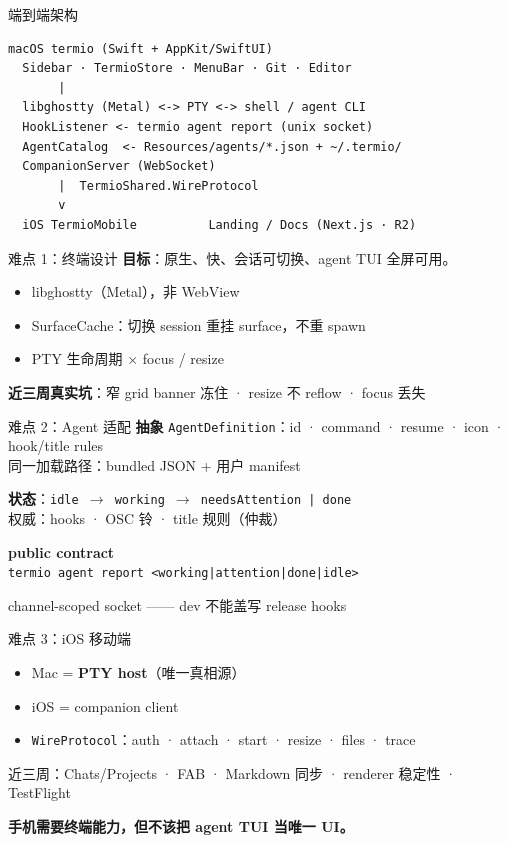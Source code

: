 \documentclass[aspectratio=169,10pt,UTF8]{ctexbeamer}
\begin{document}
\begin{frame}[fragile]{端到端架构}
\begin{lstlisting}[basicstyle=\ttfamily\tiny]
macOS termio (Swift + AppKit/SwiftUI)
  Sidebar · TermioStore · MenuBar · Git · Editor
       |
  libghostty (Metal) <-> PTY <-> shell / agent CLI
  HookListener <- termio agent report (unix socket)
  AgentCatalog  <- Resources/agents/*.json + ~/.termio/
  CompanionServer (WebSocket)
       |  TermioShared.WireProtocol
       v
  iOS TermioMobile          Landing / Docs (Next.js · R2)
\end{lstlisting}
\end{frame}

\begin{frame}{难点 1：终端设计}
  \textbf{目标}：原生、快、会话可切换、agent TUI 全屏可用。
  \begin{itemize}
    \item libghostty（Metal），非 WebView
    \item SurfaceCache：切换 session 重挂 surface，不重 spawn
    \item PTY 生命周期 $\times$ focus / resize
  \end{itemize}
  \vspace{0.4em}
  \textbf{近三周真实坑}：窄 grid banner 冻住 · resize 不 reflow · focus 丢失
\end{frame}

\begin{frame}{难点 2：Agent 适配}
  \textbf{抽象} \texttt{AgentDefinition}：id · command · resume · icon · hook/title rules\\
  同一加载路径：bundled JSON + 用户 manifest

  \vspace{0.5em}
  \textbf{状态}：\texttt{idle $\to$ working $\to$ needsAttention | done}\\
  权威：hooks · OSC 铃 · title 规则（仲裁）

  \vspace{0.5em}
  \textbf{public contract}\\[0.3em]
  \texttt{termio agent report <working|attention|done|idle>}

  \vspace{0.4em}
  channel-scoped socket —— dev 不能盖写 release hooks
\end{frame}

\begin{frame}{难点 3：iOS 移动端}
  \begin{itemize}
    \item Mac = \textbf{PTY host}（唯一真相源）
    \item iOS = companion client
    \item \texttt{WireProtocol}：auth · attach · start · resize · files · trace
  \end{itemize}
  \vspace{0.5em}
  近三周：Chats/Projects · FAB · Markdown 同步 · renderer 稳定性 · TestFlight

  \vspace{0.5em}
  \centering
  \textbf{手机需要终端能力，但不该把 agent TUI 当唯一 UI。}
\end{frame}
\end{document}
